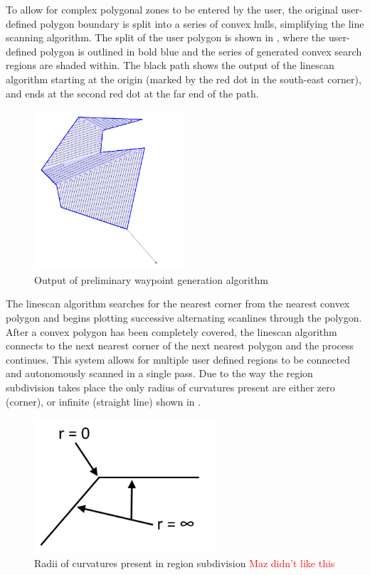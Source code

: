 \documentclass[main.tex]{subfiles}
\begin{document}
To allow for complex polygonal zones to be entered by the user, the original user-defined polygon boundary is split into a series of convex hulls, simplifying the line scanning algorithm. The split of the user polygon is shown in , where the user-defined polygon is outlined in bold blue and the series of generated convex search regions are shaded within. The black path shows the output of the linescan algorithm starting at the origin (marked by the red dot in the south-east corner), and ends at the second red dot at the far end of the path. 
\begin{figure}[ht]
\includegraphics[width=0.5\textwidth]{4-DetailedDesign/lineScanAlgorithm.png}
\centering
\caption{Output of preliminary waypoint generation algorithm} 
\end{figure}
The linescan algorithm searches for the nearest corner from the nearest convex polygon and begins plotting successive alternating scanlines through the polygon. After a convex polygon has been completely covered, the linescan algorithm connects to the next nearest corner of the next nearest polygon and the process continues. This system allows for multiple user defined regions to be connected and autonomously scanned in a single pass. Due to the way the region subdivision takes place the only radius of curvatures present are either zero (corner), or infinite (straight line) shown in .
\begin{figure}[ht]
\includegraphics[width=0.6\textwidth]{4-DetailedDesign/radiusOfCurvatures.png}
\centering
\caption{Radii of curvatures present in region subdivision \textcolor{red}{Maz didn't like this}} 
\end{figure}
\end{document}
